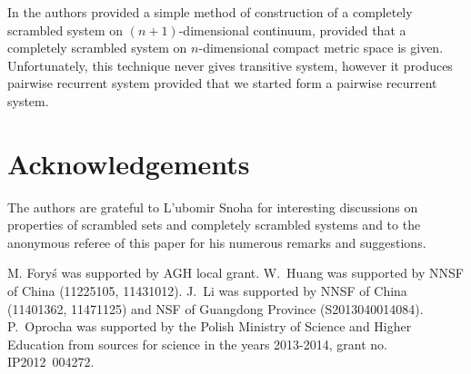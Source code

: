 \documentclass[reqno,a4paper,12pt]{amsart}
\theoremstyle{definition}
\numberwithin{equation}{section}
\begin{document}
In \cite{HY02} the authors provided a simple method of construction of a completely scrambled system on $(n+1)$-dimensional continuum,
provided that a completely scrambled system on $n$-dimensional compact metric space is given. Unfortunately, this technique never gives
transitive system, however it produces pairwise recurrent system provided that we started form a pairwise recurrent system.

\section*{Acknowledgements}
The authors are grateful to L'ubomir Snoha for interesting discussions on properties of scrambled sets
and completely scrambled systems and to the anonymous referee of this paper for his numerous remarks and suggestions.

M. Fory\'s was supported by AGH local grant.  W.~Huang was supported by NNSF of China (11225105, 11431012).
J.~Li was supported by NNSF of China (11401362, 11471125) and NSF of Guangdong Province (S2013040014084).
P.~Oprocha was supported by the Polish Ministry of Science and Higher Education from sources
for science in the years 2013-2014, grant  no. IP2012~004272.
\end{document}
